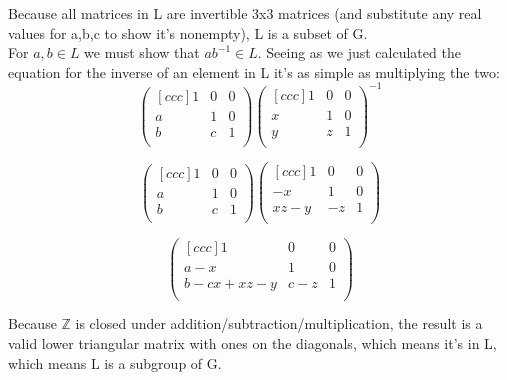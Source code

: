 \begin{enumerate}
\begin{enumerate}
      Because all matrices in L are invertible 3x3 matrices (and substitute any real values for a,b,c to show it's nonempty), L is a subset of G.\\
      
      For $a,b\in L$ we must show that $ab^{-1} \in L$. Seeing as we just calculated the equation for the inverse of an element in L it's as simple as multiplying the two:
      $$
      \begin{pmatrix}[ccc]
        1 & 0 & 0 \\
        a & 1 & 0 \\
        b & c & 1 \\
      \end{pmatrix}      
      \begin{pmatrix}[ccc]
        1 & 0 & 0 \\
        x & 1 & 0 \\
        y & z & 1 \\
      \end{pmatrix}^{-1}
      $$
      
      $$
      \begin{pmatrix}[ccc]
        1 & 0 & 0 \\
        a & 1 & 0 \\
        b & c & 1 \\
      \end{pmatrix}      
      \begin{pmatrix}[ccc]
        1    &  0 & 0 \\
        -x   &  1 & 0 \\
        xz-y & -z & 1 \\
      \end{pmatrix}
      $$

      $$
      \begin{pmatrix}[ccc]
        1          & 0   & 0 \\
        a-x        & 1   & 0 \\
        b-cx+xz-y  & c-z & 1 \\
      \end{pmatrix}
      $$

      Because $\mathds{Z}$ is closed under addition/subtraction/multiplication, the result is a valid lower triangular matrix with ones on the diagonals, which means it's in L, which means L is a subgroup of G.\\



\end{enumerate}
\end{enumerate}
